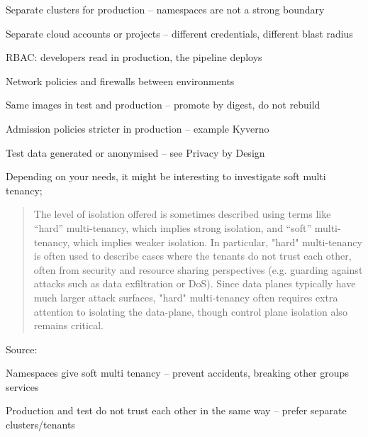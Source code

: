 \documentclass[Screen16to9,17pt]{foils}
\begin{document}
\begin{list2}
\item Separate clusters for production -- namespaces are not a strong boundary
\item Separate cloud accounts or projects -- different credentials, different blast radius
\item RBAC: developers read in production, the pipeline deploys
\item Network policies and firewalls between environments
\item Same images in test and production -- promote by digest, do not rebuild
\item Admission policies stricter in production -- example Kyverno
\item Test data generated or anonymised -- see Privacy by Design
\end{list2}



Depending on your needs, it might be interesting to investigate soft multi tenancy;

\begin{quote}
The level of isolation offered is sometimes described using terms like “hard” multi-tenancy, which implies strong isolation, and “soft” multi-tenancy, which implies weaker isolation. In particular, "hard" multi-tenancy is often used to describe cases where the tenants do not trust each other, often from security and resource sharing perspectives (e.g. guarding against attacks such as data exfiltration or DoS). Since data planes typically have much larger attack surfaces, "hard" multi-tenancy often requires extra attention to isolating the data-plane, though control plane isolation also remains critical.
\end{quote}
Source: 

\begin{list2}
\item Namespaces give soft multi tenancy -- prevent accidents, breaking other groups services
\item Production and test do not trust each other in the same way -- prefer separate clusters/tenants
\end{list2}

\end{document}
